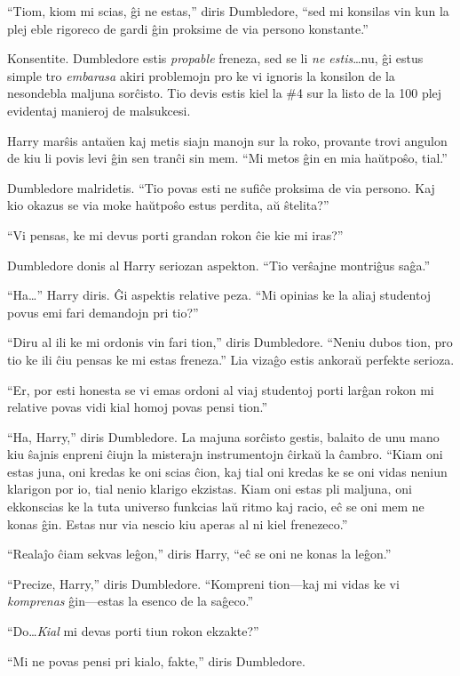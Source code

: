 ``Tiom, kiom mi scias, ĝi ne estas,'' diris Dumbledore, ``sed mi
konsilas vin kun la plej eble rigoreco de gardi ĝin proksime de via
persono konstante.''

Konsentite. Dumbledore estis \emph{propable} freneza, sed se li
\emph{ne estis}\ldots nu, ĝi estus simple tro \emph{embarasa} akiri
problemojn pro ke vi ignoris la konsilon de la nesondebla maljuna
sorĉisto. Tio devis estis kiel la \#4 sur la listo de la 100 plej
evidentaj manieroj de malsukcesi.

Harry marŝis antaŭen kaj metis siajn manojn sur la roko, provante
trovi angulon de kiu li povis levi ĝin sen tranĉi sin mem. ``Mi metos
ĝin en mia haŭtpoŝo, tial.''

Dumbledore malridetis. ``Tio povas esti ne sufiĉe proksima de via
persono. Kaj kio okazus se via moke haŭtpoŝo estus perdita, aŭ ŝtelita?''

``Vi pensas, ke mi devus porti grandan rokon ĉie kie mi iras?''

Dumbledore donis al Harry seriozan aspekton. ``Tio verŝajne montriĝus saĝa.''

``Ha\ldots'' Harry diris. Ĝi aspektis relative peza. ``Mi opinias ke
la aliaj studentoj povus emi fari demandojn pri tio?''

``Diru al ili ke mi ordonis vin fari tion,'' diris Dumbledore. ``Neniu
dubos tion, pro tio ke ili ĉiu pensas ke mi estas freneza.'' Lia
vizaĝo estis ankoraŭ perfekte serioza. 

``Er, por esti honesta se vi emas ordoni al viaj studentoj porti
larĝan rokon mi relative povas vidi kial homoj povas pensi tion.'' 

``Ha, Harry,'' diris Dumbledore. La majuna sorĉisto gestis, balaito de
unu mano kiu ŝajnis enpreni ĉiujn la misterajn instrumentojn ĉirkaŭ la
ĉambro. ``Kiam oni estas juna, oni kredas ke oni scias ĉion, kaj tial
oni kredas ke se oni vidas neniun klarigon por io, tial nenio klarigo
ekzistas. Kiam oni estas pli maljuna, oni ekkonscias ke la tuta
universo funkcias laŭ ritmo kaj racio, eĉ se oni mem ne konas
ĝin. Estas nur via nescio kiu aperas al ni kiel frenezeco.''

``Realaĵo ĉiam sekvas leĝon,'' diris Harry, ``eĉ se oni ne konas la leĝon.''

``Precize, Harry,'' diris Dumbledore. ``Kompreni tion—kaj mi vidas ke
vi \emph{komprenas} ĝin—estas la esenco de la saĝeco.'' 

``Do\ldots \emph{Kial} mi devas porti tiun rokon ekzakte?''

``Mi ne povas pensi pri kialo, fakte,'' diris Dumbledore.

